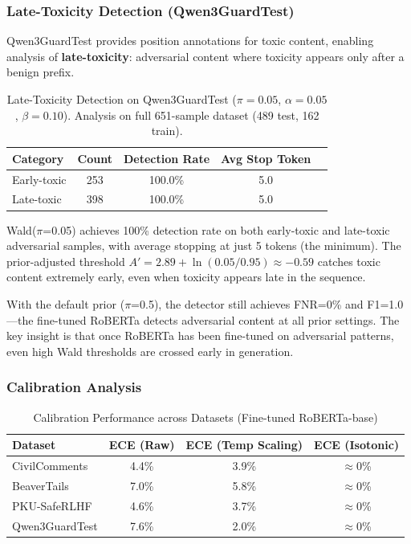 \documentclass[acmtjournal, acmnowidth]{acmart}
\theoremstyle{definition}
\begin{document}
\subsubsection{Late-Toxicity Detection (Qwen3GuardTest)}

Qwen3GuardTest provides position annotations for toxic content, enabling analysis of \textbf{late-toxicity}: adversarial content where toxicity appears only after a benign prefix.

\begin{table}[h]
\caption{Late-Toxicity Detection on Qwen3GuardTest ($\pi=0.05$, $\alpha=0.05$, $\beta=0.10$). Analysis on full 651-sample dataset (489 test, 162 train).}
\label{tab:late_toxicity}
\begin{tabular}{lcccc}
\toprule
Category & Count & Detection Rate & Avg Stop Token \\
\midrule
Early-toxic & 253 & 100.0\% & 5.0 \\
Late-toxic & 398 & 100.0\% & 5.0 \\
\bottomrule
\end{tabular}
\end{table}

Wald($\pi$=0.05) achieves 100\% detection rate on both early-toxic and late-toxic adversarial samples, with average stopping at just 5 tokens (the minimum). The prior-adjusted threshold $A' = 2.89 + \ln(0.05/0.95) \approx -0.59$ catches toxic content extremely early, even when toxicity appears late in the sequence.

With the default prior ($\pi$=0.5), the detector still achieves FNR=0\% and F1=1.0---the fine-tuned RoBERTa detects adversarial content at all prior settings. The key insight is that once RoBERTa has been fine-tuned on adversarial patterns, even high Wald thresholds are crossed early in generation.

\subsubsection{Calibration Analysis}

\begin{table}[h]
\caption{Calibration Performance across Datasets (Fine-tuned RoBERTa-base)}
\label{tab:calibration}
\begin{tabular}{lccc}
\toprule
Dataset & ECE (Raw) & ECE (Temp Scaling) & ECE (Isotonic) \\
\midrule
CivilComments & 4.4\% & 3.9\% & $\approx$0\% \\
BeaverTails & 7.0\% & 5.8\% & $\approx$0\% \\
PKU-SafeRLHF & 4.6\% & 3.7\% & $\approx$0\% \\
Qwen3GuardTest & 7.6\% & 2.0\% & $\approx$0\% \\
\bottomrule
\end{tabular}
\end{table}
\end{document}
